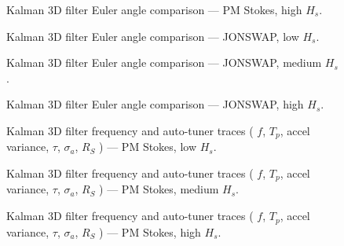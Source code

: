 \documentclass[11pt,letterpaper]{article}
\begin{document}
\begin{figure}[H]\centering
  \resizebox{\textwidth}{!}{}
  \caption{Kalman 3D filter Euler angle comparison — PM Stokes, high $H_s$.}
  \label{fig:w3d_pmstokes_high}
\end{figure}

\begin{figure}[H]\centering
  \resizebox{\textwidth}{!}{}
  \caption{Kalman 3D filter Euler angle comparison — JONSWAP, low $H_s$.}
  \label{fig:w3d_jonswap_low}
\end{figure}

\begin{figure}[H]\centering
  \resizebox{\textwidth}{!}{}
  \caption{Kalman 3D filter Euler angle comparison — JONSWAP, medium $H_s$.}
  \label{fig:w3d_jonswap_medium}
\end{figure}

\begin{figure}[H]\centering
  \resizebox{\textwidth}{!}{}
  \caption{Kalman 3D filter Euler angle comparison — JONSWAP, high $H_s$.}
  \label{fig:w3d_jonswap_high}
\end{figure}



\begin{figure}[H]\centering
  \resizebox{\textwidth}{!}{}
  \caption{Kalman 3D filter frequency and auto-tuner traces ( $f$, $T_p$, accel variance, $\tau$, $\sigma_a$, $R_S$ ) — PM Stokes, low $H_s$.}
  \label{fig:w3d_pmstokes_low_tuner}
\end{figure}

\begin{figure}[H]\centering
  \resizebox{\textwidth}{!}{}
  \caption{Kalman 3D filter frequency and auto-tuner traces ( $f$, $T_p$, accel variance, $\tau$, $\sigma_a$, $R_S$ ) — PM Stokes, medium $H_s$.}
  \label{fig:w3d_pmstokes_medium_tuner}
\end{figure}

\begin{figure}[H]\centering
  \resizebox{\textwidth}{!}{}
  \caption{Kalman 3D filter frequency and auto-tuner traces ( $f$, $T_p$, accel variance, $\tau$, $\sigma_a$, $R_S$ ) — PM Stokes, high $H_s$.}
  \label{fig:w3d_pmstokes_high_tuner}
\end{figure}
\end{document}

